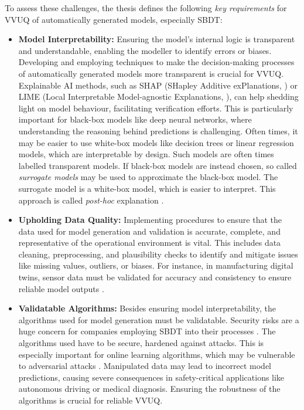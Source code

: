 To assess these challenges, the thesis defines the following \textit{key requirements} for VVUQ of automatically generated models, especially SBDT:
\begin{itemize}
  \label{par:key-requirements}
  \item \textbf{Model Interpretability:} \label{par:surrogate} Ensuring the model's internal logic is transparent and understandable, enabling the modeller to identify errors or biases. Developing and employing techniques to make the decision-making processes of automatically generated models more transparent is crucial for VVUQ. Explainable AI methods, such as SHAP (SHapley Additive exPlanations, \autocite{lundberg2017unified}) or LIME (Local Interpretable Model-agnostic Explanations, \autocite{ribeiro2016should}), can help shedding light on model behaviour, facilitating verification efforts. This is particularly important for black-box models like deep neural networks, where understanding the reasoning behind predictions is challenging. Often times, it may be easier to use white-box models like decision trees or linear regression models, which are interpretable by design. Such models are often times labelled transparent models. If black-box models are instead chosen, so called \textit{surrogate models} may be used to approximate the black-box model. The surrogate model is a white-box model, which is easier to interpret. This approach is called \textit{post-hoc} explanation \autocite{fischer2024demystifying}.
  \item \textbf{Upholding Data Quality:} Implementing procedures to ensure that the data used for model generation and validation is accurate, complete, and representative of the operational environment is vital. This includes data cleaning, preprocessing, and plausibility checks to identify and mitigate issues like missing values, outliers, or biases. For instance, in manufacturing digital twins, sensor data must be validated for accuracy and consistency to ensure reliable model outputs \autocite{rodriguez2023updating}.
  \item \textbf{Validatable Algorithms:} Besides ensuring model interpretability, the algorithms used for model generation must be validatable. Security risks are a huge concern for companies employing SBDT into their processes \autocite{alcaraz2022digital}. The algorithms used have to be secure, hardened against attacks. This is especially important for online learning algorithms, which may be vulnerable to adversarial attacks \autocite{balta2023digital}. Manipulated data may lead to incorrect model predictions, causing severe consequences in safety-critical applications like autonomous driving or medical diagnosis. Ensuring the robustness of the algorithms is crucial for reliable VVUQ.

\end{itemize}
